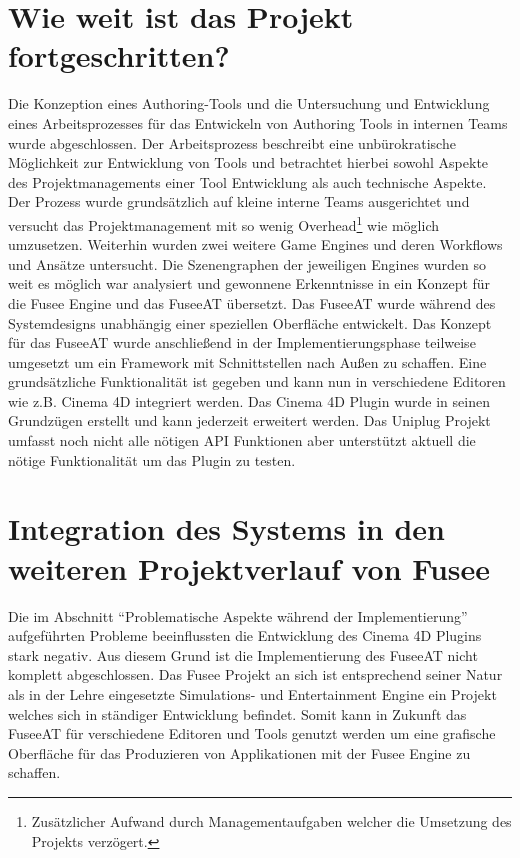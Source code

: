 \documentclass[pagesize, paper=a4, fontsize=12pt, titlepage=true, headings=small, headnosepline, abstractoff, liststotoc, nochapterprefix, plainheadsepline, twoside]{scrreprt}
\begin{document}
\section{Wie weit ist das Projekt fortgeschritten?}
Die Konzeption eines Authoring-Tools und die Untersuchung und Entwicklung eines Arbeitsprozesses für das Entwickeln von Authoring Tools in internen Teams wurde abgeschlossen. Der Arbeitsprozess beschreibt eine unbürokratische Möglichkeit zur Entwicklung von Tools und betrachtet hierbei sowohl Aspekte des Projektmanagements einer Tool Entwicklung als auch technische Aspekte. Der Prozess wurde grundsätzlich auf kleine interne Teams ausgerichtet und versucht das Projektmanagement mit so wenig Overhead\footnote{Zusätzlicher Aufwand durch Managementaufgaben welcher die Umsetzung des Projekts verzögert.} wie möglich umzusetzen. Weiterhin wurden zwei weitere Game Engines und deren Workflows und Ansätze untersucht. Die Szenengraphen der jeweiligen Engines wurden so weit es möglich war analysiert und gewonnene Erkenntnisse in ein Konzept für die Fusee Engine und das FuseeAT übersetzt. Das FuseeAT wurde während des Systemdesigns unabhängig einer speziellen Oberfläche entwickelt. Das Konzept für das FuseeAT wurde anschließend in der Implementierungsphase teilweise umgesetzt um ein Framework mit Schnittstellen nach Außen zu schaffen. Eine grundsätzliche Funktionalität ist gegeben und kann nun in verschiedene Editoren wie z.B. Cinema 4D integriert werden. Das Cinema 4D Plugin wurde in seinen Grundzügen erstellt und kann jederzeit erweitert werden. Das Uniplug Projekt umfasst noch nicht alle nötigen API Funktionen aber unterstützt aktuell die nötige Funktionalität um das Plugin zu testen.

\section{Integration des Systems in den weiteren Projektverlauf von Fusee}
Die im Abschnitt “Problematische Aspekte während der Implementierung” aufgeführten Probleme beeinflussten die Entwicklung des Cinema 4D Plugins stark negativ. Aus diesem Grund ist die Implementierung des FuseeAT nicht komplett abgeschlossen. Das Fusee Projekt an sich ist entsprechend seiner Natur als in der Lehre eingesetzte Simulations- und Entertainment Engine ein Projekt welches sich in ständiger Entwicklung befindet. Somit kann in Zukunft das FuseeAT für verschiedene Editoren und Tools genutzt werden um eine grafische Oberfläche für das Produzieren von Applikationen mit der Fusee Engine zu schaffen.  
\end{document}
